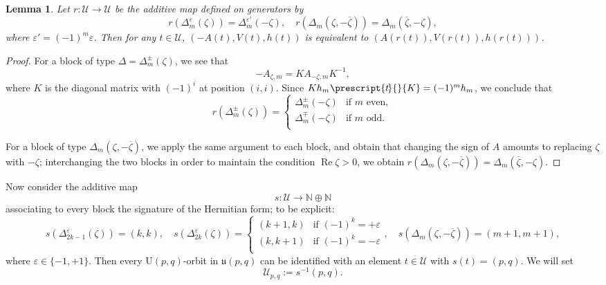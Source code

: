 \documentclass{article}
\newtheorem{lemma}[theorem]{Lemma}
\theoremstyle{definition}
\newcommand{\N}{\mathbb{N}}
\renewcommand{\Re}{\operatorname{Re}}
\newcommand{\tran}[1]{\hspace{.2mm}\prescript{t\hspace{-.5mm}}{}{#1}}
\newcommand{\lie}[1]{\mathfrak{#1}}
\begin{document}
\begin{lemma}\label{lemma:changesign}
    Let $r\colon \mathcal{U}\to\mathcal{U}$ be the additive map defined on generators by $$r(\Delta^{\varepsilon}_m(\zeta))=\Delta^{\varepsilon'}_m(-\zeta),\quad r(\Delta_m(\zeta,-\overline\zeta))=\Delta_m(\overline\zeta,-\zeta),$$ where $\varepsilon'=(-1)^m\varepsilon$. Then for any $t\in\mathcal{U}$, $(-A(t),V(t),h(t))$ is equivalent to $(A(r(t)),V(r(t)),h(r(t)))$.
\end{lemma}

\begin{proof}
    For a block of type $\Delta=\Delta^{\pm}_m(\zeta)$, we see that $$-A_{\zeta,m}=KA_{-\zeta,m}K^{-1},$$ where $K$ is the diagonal matrix with $(-1)^{i}$ at position $(i,i)$. Since $Kh_m\tran K=(-1)^{m}h_m$, we conclude that $$r(\Delta^{\pm}_m(\zeta))=\begin{cases}
        \Delta^{\pm}_m(-\zeta)&\text{if }m\text{ even},\\
        \Delta^{\mp}_m(-\zeta)&\text{if }m\text{ odd}.\\
    \end{cases}$$

    For a block of type $\Delta_m(\zeta,-\overline\zeta)$, we apply the same argument to each block, and obtain that changing the sign of $A$ amounts to replacing $\zeta$ with $-\zeta$; interchanging the two blocks in order to maintain the condition $\Re\zeta>0$, we obtain $r(\Delta_m(\zeta,-\overline\zeta))=\Delta_m(\overline\zeta,-\zeta)$.
\end{proof}

Now consider the additive map \begin{equation}\label{eq:signature_map}
    s\colon \mathcal U\to\N\oplus\N
\end{equation} associating to every block the signature of the Hermitian form; to be explicit: $$s(\Delta_{2k-1}^\varepsilon(\zeta))=(k,k),\quad s(\Delta_{2k}^\varepsilon(\zeta))=\begin{cases}
    (k+1,k)&\mbox{if }(-1)^k=+\varepsilon\\
    (k,k+1)&\mbox{if }(-1)^k=-\varepsilon\\
\end{cases},\quad s(\Delta_m(\zeta,-\overline\zeta))=(m+1,m+1),$$ where $\varepsilon\in\{-1,+1\}$. Then every $\mathrm{U}(p,q)$-orbit in $\lie u(p,q)$ can be identified with an element $t\in\mathcal{U}$ with $s(t)=(p,q)$. We will set $$\mathcal{U}_{p,q}:=s^{-1}(p,q).$$
\end{document}
